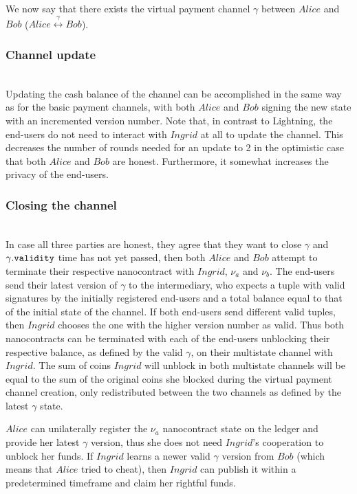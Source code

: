     We now say that there exists the virtual payment channel $\gamma$ between $Alice$ and
    $Bob$ ($Alice \overset{\gamma}{\leftrightarrow} Bob$).

  \subsubsection{Channel update} \ \\

    Updating the cash balance of the channel can be accomplished in the same way as for
    the basic payment channels, with both $Alice$ and $Bob$ signing the new state with an
    incremented version number. Note that, in contrast to Lightning, the end-users do not
    need to interact with $Ingrid$ at all to update the channel. This decreases the number
    of rounds needed for an update to 2 in the optimistic case that both $Alice$ and $Bob$
    are honest. Furthermore, it somewhat increases the privacy of the end-users.

  \subsubsection{Closing the channel} \ \\

    In case all three parties are honest, they agree that they want to close $\gamma$ and
    $\gamma\mbox{.\texttt{validity}}$ time has not yet passed, then both $Alice$ and $Bob$
    attempt to terminate their respective nanocontract with $Ingrid$, $\nu_a$ and $\nu_b$.
    The end-users send their latest version of $\gamma$ to the intermediary, who expects a
    tuple with valid signatures by the initially registered end-users and a total balance
    equal to that of the initial state of the channel. If both end-users send different
    valid tuples, then $Ingrid$ chooses the one with the higher version number as valid.
    Thus both nanocontracts can be terminated with each of the end-users unblocking their
    respective balance, as defined by the valid $\gamma$, on their multistate channel with
    $Ingrid$. The sum of coins $Ingrid$ will unblock in both multistate channels will be
    equal to the sum of the original coins she blocked during the virtual payment channel
    creation, only redistributed between the two channels as defined by the latest
    $\gamma$ state.

    $Alice$ can unilaterally register the $\nu_a$ nanocontract state on the ledger and
    provide her latest $\gamma$ version, thus she does not need $Ingrid$'s cooperation to
    unblock her funds. If $Ingrid$ learns a newer valid $\gamma$ version from $Bob$ (which
    means that $Alice$ tried to cheat), then $Ingrid$ can publish it within a
    predetermined timeframe and claim her rightful funds.

